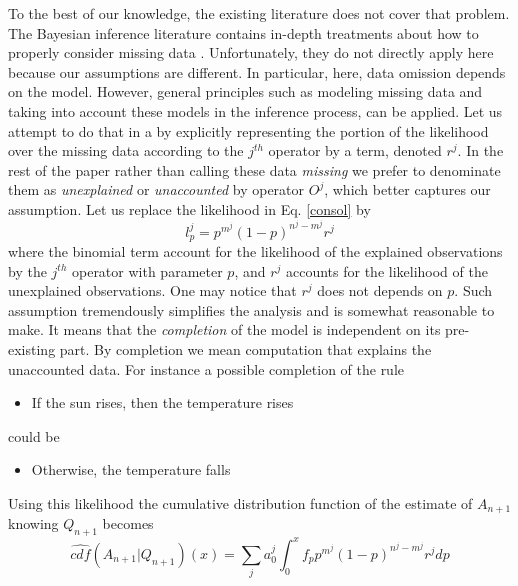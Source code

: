 \documentclass[runningheads]{llncs}
\begin{document}
To the best of our knowledge, the existing literature does not cover
that problem. The Bayesian inference literature contains in-depth
treatments about how to properly consider missing data
\cite{Schafer02missingdata}. Unfortunately, they do not directly apply
here because our assumptions are different. In particular, here, data
omission depends on the model. However, general principles such as
modeling missing data and taking into account these models in the
inference process, can be applied. Let us attempt to do that in a by
explicitly representing the portion of the likelihood over the missing
data according to the $j^{th}$ operator by a term, denoted $r^j$. In
the rest of the paper rather than calling these data \emph{missing} we
prefer to denominate them as \emph{unexplained} or \emph{unaccounted}
by operator $O^j$, which better captures our assumption. Let us
replace the likelihood in Eq. \ref{consol} by
\begin{equation}
l^j_p = p^{m^j}(1-p)^{n^j-m^j} r^j
\end{equation}
where the binomial term account for the likelihood of the explained
observations by the $j^{th}$ operator with parameter $p$, and $r^j$
accounts for the likelihood of the unexplained observations. One may
notice that $r^j$ does not depends on $p$. Such assumption
tremendously simplifies the analysis and is somewhat reasonable to
make. It means that the \emph{completion} of the model is independent
on its pre-existing part. By completion we mean computation that
explains the unaccounted data. For instance a possible completion of
the rule
\begin{itemize}
\item If the sun rises, then the temperature rises
\end{itemize}
could be
\begin{itemize}
\item Otherwise, the temperature falls
\end{itemize}
Using this likelihood the cumulative distribution function of the
estimate of $A_{n+1}$ knowing $Q_{n+1}$ becomes
\begin{equation}
  \label{betaconsol}
  \hat{cdf}(A_{n+1}|Q_{n+1})(x) = \sum_j a_0^j \int_0^x f_p p^{m^j}(1-p)^{n^j-m^j}
  r^j dp
\end{equation}
\end{document}
